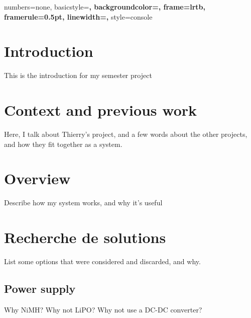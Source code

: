 
\newcommand{\expr}[1]{\og \emph{{#1}} \fg} %
\newcommand{\important}[1]{\textbf{#1}}
\newcommand{\code}[1]{\texttt{#1}}

\tableofcontents{}

\newpage

\lstset{language=C}
{
  numbers=none,
  basicstyle=\bf\ttfamily,
  backgroundcolor=\color{grey92},
  frame=lrtb,
  framerule=0.5pt,
  linewidth=\textwidth,
}
{
  style=console
}

\lstset{
  style=console
}



\section*{Introduction}
This is the introduction for my semester project

\section{Context and previous work}
Here, I talk about Thierry's project, and a few words about the other projects,
and how they fit together as a system.

\section{Overview}
Describe how my system works, and why it's useful

\section{Recherche de solutions}
List some options that were considered and discarded, and why.

\subsection{Power supply}
Why NiMH? Why not LiPO? Why not use a DC-DC converter?

